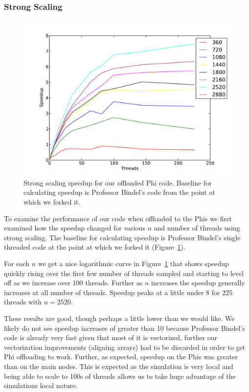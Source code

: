 \subsubsection{Strong Scaling}
\begin{figure}[h!]
\centering
\includegraphics[width=0.5\linewidth]{mic_strong_bindel_baseline.pdf}
\caption{Strong scaling speedup for our offloaded Phi code. Baseline for calculating speedup is Professor Bindel's code from the point at which we forked it.}
\label{fig:strong-mic-bindel}
\end{figure}

To examine the performance of our code when offloaded to the Phis we first examined how the speedup changed for various $n$ and number of threads using strong scaling. The baseline for calculating speedup is Professor Bindel's single threaded code at the point at which we forked it (Figure~\ref{fig:strong-mic-bindel}).

For each $n$ we get a nice logarithmic curve in Figure~\ref{fig:strong-mic-bindel} that shows speedup quickly rising over the first few number of threads sampled and starting to level off as we increase over 100 threads. Further as $n$ increases the speedup generally increases at all number of threads. Speedup peaks at a little under 8 for 225 threads with $n=2520$.

These results are good, though perhaps a little lower than we would like. We likely do not see speedup increases of greater than 10 because Professor Bindel's code is already very fast given that most of it is vectorized, further our vectorization improvements (aligning arrays) had to be discarded in order to get Phi offloading to work. Further, as expected, speedup on the Phis was greater than on the main nodes. This is expected as the simulation is very local and being able to scale to 100s of threads allows us to take huge advantage of the simulations local nature.

